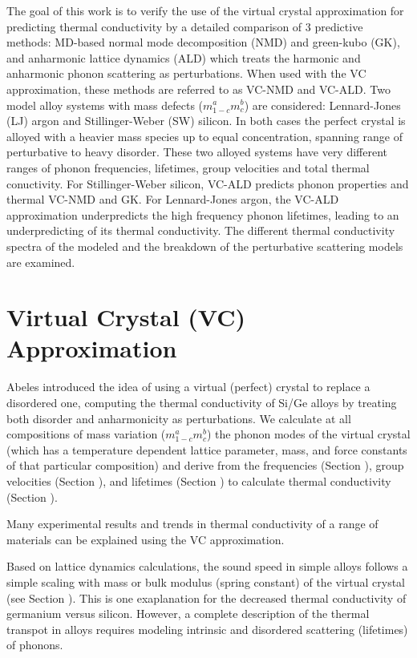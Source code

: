 \documentclass[aps,prb,twocolumn,superscriptaddress,preprintnumbers,amsmath,amssymb,floatfix]{revtex4}
\begin{document}
The goal of this work is to verify the use of the virtual crystal 
approximation for predicting thermal conductivity by a detailed comparison 
of 3 predictive methods: MD-based normal mode 
decomposition (NMD) and green-kubo (GK), 
and anharmonic lattice dynamics (ALD) which treats the harmonic and 
anharmonic phonon scattering as perturbations. When used with the VC 
approximation, these methods are referred to as VC-NMD and VC-ALD.
Two model alloy systems 
with mass defects ($m^a_{1-c}m^b_{c}$) are considered: 
Lennard-Jones (LJ) argon and Stillinger-Weber (SW) silicon. 
In both cases the perfect crystal is 
alloyed with a heavier mass species up to equal concentration, spanning 
range of perturbative to heavy disorder. These 
two alloyed systems have very different ranges of phonon frequencies, 
lifetimes, group velocities and total thermal conuctivity. 
For Stillinger-Weber silicon, 
VC-ALD predicts phonon properties and thermal VC-NMD and GK. 
For Lennard-Jones argon, the VC-ALD approximation underpredicts 
the high frequency phonon lifetimes, leading to an underpredicting of 
its thermal conductivity. The different thermal conductivity spectra of 
the modeled 
and the breakdown of the perturbative scattering models are examined.

\section{\label{S:}Virtual Crystal (VC) Approximation}
Abeles introduced the idea of using a virtual (perfect) crystal 
to replace a disordered one, computing the
thermal conductivity of Si/Ge alloys by treating both
disorder and anharmonicity as perturbations.
\cite{abeles_lattice_1963} 
We calculate at all compositions of mass variation ($m^a_{1-c}m^b_{c}$)
the phonon modes of the virtual crystal (which has
a temperature dependent lattice parameter, mass, and
force constants of that particular composition)
and derive from the frequencies (Section ), 
group velocities (Section ),
and lifetimes (Section ) to calculate thermal
conductivity (Section ).

Many experimental results and trends in thermal conductivity 
of a range of materials 
can be explained using the VC approximation.  

Based on lattice dynamics 
calculations, the sound speed in simple alloys follows a simple scaling 
with mass or bulk modulus (spring constant) of the virtual crystal (see 
Section ). This is one exaplanation for the decreased thermal 
conductivity of germanium versus silicon. However, a complete 
description of the thermal transpot in alloys requires modeling intrinsic 
and 
disordered scattering (lifetimes) of phonons.
\end{document}
